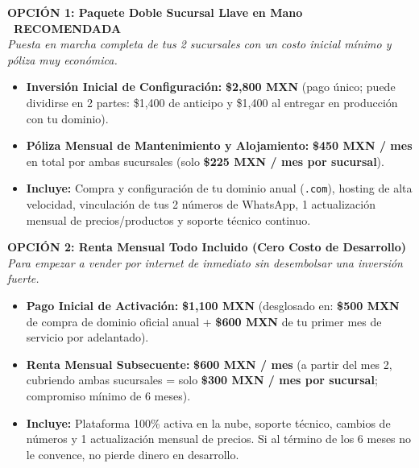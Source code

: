 \documentclass[10pt,letterpaper]{article}
\begin{document}
\begin{tcolorbox}[colback=white, colframe=DarkAmber, boxrule=1.5pt]
    {\color{DarkAmber}\textbf{\normalsize OPCIÓN 1: Paquete Doble Sucursal Llave en Mano}} \hfill \textbf{\color{EmeraldGreen}\faStar\ RECOMENDADA}\\
    \textit{Puesta en marcha completa de tus 2 sucursales con un costo inicial mínimo y póliza muy económica.}
    \begin{itemize}[leftmargin=*,itemsep=1.5pt]
        \item \textbf{Inversión Inicial de Configuración:} \textbf{\$2,800 MXN} (pago único; puede dividirse en 2 partes: \$1,400 de anticipo y \$1,400 al entregar en producción con tu dominio).
        \item \textbf{Póliza Mensual de Mantenimiento y Alojamiento:} \textbf{\$450 MXN / mes} en total por ambas sucursales (solo \textbf{\$225 MXN / mes por sucursal}).
        \item \textbf{Incluye:} Compra y configuración de tu dominio anual (\texttt{.com}), hosting de alta velocidad, vinculación de tus 2 números de WhatsApp, 1 actualización mensual de precios/productos y soporte técnico continuo.
    \end{itemize}
\end{tcolorbox}

\vspace{0.1cm}

\begin{tcolorbox}[colback=white, colframe=NavyBlue, boxrule=1pt]
    {\color{NavyBlue}\textbf{\normalsize OPCIÓN 2: Renta Mensual Todo Incluido (Cero Costo de Desarrollo)}} \\
    \textit{Para empezar a vender por internet de inmediato sin desembolsar una inversión fuerte.}
    \begin{itemize}[leftmargin=*,itemsep=1.5pt]
        \item \textbf{Pago Inicial de Activación:} \textbf{\$1,100 MXN} (desglosado en: \textbf{\$500 MXN} de compra de dominio oficial anual + \textbf{\$600 MXN} de tu primer mes de servicio por adelantado).
        \item \textbf{Renta Mensual Subsecuente:} \textbf{\$600 MXN / mes} (a partir del mes 2, cubriendo ambas sucursales = solo \textbf{\$300 MXN / mes por sucursal}; compromiso mínimo de 6 meses).
        \item \textbf{Incluye:} Plataforma 100\% activa en la nube, soporte técnico, cambios de números y 1 actualización mensual de precios. Si al término de los 6 meses no le convence, no pierde dinero en desarrollo.
    \end{itemize}
\end{tcolorbox}
\end{document}
